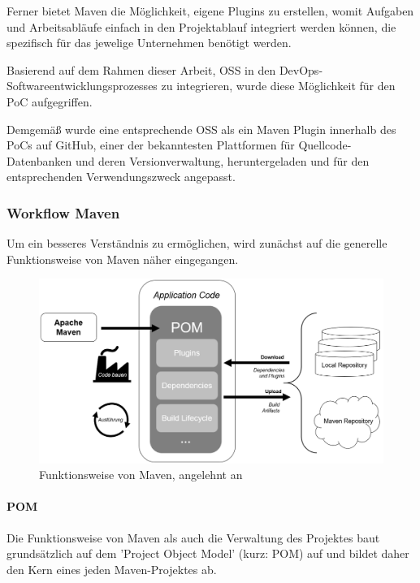 Ferner bietet Maven die Möglichkeit, eigene Plugins zu erstellen, womit Aufgaben und Arbeitsabläufe einfach in den Projektablauf integriert werden können, die spezifisch für das jewelige Unternehmen benötigt werden. \cite[S. 3]{varanasi_introducing_2019}

Basierend auf dem Rahmen dieser Arbeit, OSS in den DevOps-Softwareentwicklungsprozesses zu integrieren, wurde diese Möglichkeit für den PoC aufgegriffen. 

Demgemäß wurde eine entsprechende OSS als ein Maven Plugin \cite{allberg_ayoyabayoy-maven-license-verifier-plugin_2021} innerhalb des PoCs auf GitHub, einer der bekanntesten Plattformen für Quellcode-Datenbanken und deren Versionverwaltung, heruntergeladen und für den entsprechenden Verwendungszweck angepasst.

\subsubsection{Workflow Maven}

Um ein besseres Verständnis zu ermöglichen, wird zunächst auf die generelle Funktionsweise von Maven näher eingegangen. 

\begin{figure}[h]
    \centering
    \includegraphics[scale=0.6]{Bilder/Workflow_Maven.png}
    \caption{Funktionsweise von Maven, angelehnt an \cite{guntur_understanding_2020}}
\end{figure}

\paragraph{POM}
Die Funktionsweise von Maven als auch die Verwaltung des Projektes baut grundsätzlich auf dem 'Project Object Model' (kurz: POM) auf und bildet daher den Kern eines jeden Maven-Projektes ab.

